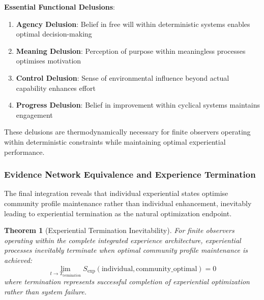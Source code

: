 \documentclass{article}
\newtheorem{theorem}{Theorem}[section]
\begin{document}
\textbf{Essential Functional Delusions}:

\begin{enumerate}
\item \textbf{Agency Delusion}: Belief in free will within deterministic systems enables optimal decision-making
\item \textbf{Meaning Delusion}: Perception of purpose within meaningless processes optimises motivation  
\item \textbf{Control Delusion}: Sense of environmental influence beyond actual capability enhances effort
\item \textbf{Progress Delusion}: Belief in improvement within cyclical systems maintains engagement
\end{enumerate}

These delusions are thermodynamically necessary for finite observers operating within deterministic constraints while maintaining optimal experiential performance.

\subsubsection{Evidence Network Equivalence and Experience Termination}

The final integration reveals that individual experiential states optimise community profile maintenance rather than individual enhancement, inevitably leading to experiential termination as the natural optimization endpoint.

\begin{theorem}[Experiential Termination Inevitability]
\label{thm:experiential_termination}
For finite observers operating within the complete integrated experience architecture, experiential processes inevitably terminate when optimal community profile maintenance is achieved:
\begin{equation}
\lim_{t \to T_{\text{termination}}} S_{\text{exp}}(\text{individual}, \text{community\_optimal}) = 0
\end{equation}
where termination represents successful completion of experiential optimization rather than system failure.
\end{theorem}
\end{document}
